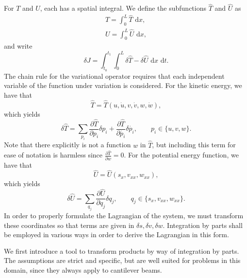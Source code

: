 For $T$ and $U$, each has a spatial integral. We define the subfunctions $\hat T$ and $\hat U$ as
\begin{eqnarray}
T = \int_0^L \hat T \text{ d}x, \\
U = \int_0^L \hat U \text{ d}x,
\end{eqnarray}
and write
\begin{equation}
\delta J = \int_{t_0}^{t_1}\int_{0}^{L}\delta\hat T - \delta\hat U\text{ d}x\text{ d}t.
\end{equation}
The chain rule for the variational operator requires that each independent variable of the function under variation is considered. For the kinetic energy, we have that
\begin{equation}
\hat T = \hat T(u,\dot u,v,\dot v,w,\dot w),
\end{equation}
which yields 
\begin{equation}
\delta \hat T = \sum_{p_i}\frac{\partial \hat T}{\partial p_i}\delta p_i+\frac{\partial \hat T}{\partial \dot{p_i}}\delta \dot{p_i},\qquad p_i\in\{u,v,w\}.
\end{equation}
Note that there explicitly is not a function $w$ in $\hat T$, but including this term for ease of notation is harmless since $\frac{\partial\hat T}{\partial w}=0$. For the potential energy function, we have that
\begin{equation}
\hat U = \hat U(s_x,v_{xx},w_{xx}),
\end{equation}
which yields 
\begin{equation}
\delta \hat U = \sum_{q_j}\frac{\partial \hat U}{\partial q_j}\delta q_j,\qquad q_j\in\{s_x,v_{xx},w_{xx}\}.
\end{equation}
In order to properly formulate the Lagrangian of the system, we must transform these coordinates so that terms are given in $\delta s,\delta v,\delta w$. Integration by parts shall be employed in various ways in order to derive the Lagrangian in this form.

We first introduce a tool to transform products by way of integration by parts. The assumptions are strict and specific, but are well suited for problems in this domain, since they always apply to cantilever beams.

